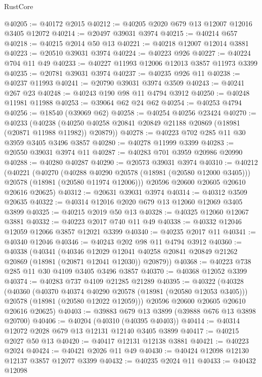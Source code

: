 \begin{lexlean}{RustCore}
\begin{coremodule}
@40205 := @40172 @2015
@40212 := @40205 @2020 @679 @13 @12007 @12016 @3405 @12072
@40214 := @20497 @39031 @3974
@40215 := @40214 @657
@40218 := @40215 @2014 @50 @13
@40221 := @40218 @12007 @12014 @3881
@40223 := @20510 @39031 @3974
@40224 := @40223 @926
@40227 := @40224 @704 @11 @49
@40233 := @40227 @11993 @12006 @12013 @3857 @11973 @3399
@40235 := @20781 @39031 @3974
@40237 := @40235 @926 @11
@40238 := @40237 @11993
@40241 := @20790 @39031 @3974 @3509
@40243 := @40241 @267 @23
@40248 := @40243 @190 @98 @11 @4794 @3912
@40250 := @40248 @11981 @11988
@40253 := @39064 @62 @24 @62
@40254 := @40253 @4794
@40256 := @18540 (@39069 @62)
@40258 := @40254 @40256 @23424
@40270 := @40233
    (@40238 (@40250 @40258 @20841 @20849 @21188 @20869 (@18981 (@20871 @11988 @11982)) @20879))
@40278 := @40223 @702 @285 @11 @30 @3959 @3405 @3496 @3857
@40280 := @40278 @11999 @3399
@40283 := @20550 @39031 @3974 @11
@40287 := @40283 @701 @3959 @20986 @20990
@40288 := @40280 @40287
@40290 := @20573 @39031 @3974
@40310 := @40212
    (@40221
      (@40270
        (@40288 @40290 @20578 (@18981 (@20580 @12000 @3405)))
        @20578
        (@18981 (@20580 @11974 @12006)))
      @20596
      @20600
      @20605
      @20610
      @20616
      @20625)
@40312 := @20631 @39031 @3974
@40314 := @40312 @3509 @20635
@40322 := @40314 @12016 @2020 @679 @13 @12060 @12069 @3405 @3899
@40325 := @40215 @2019 @50 @13
@40328 := @40325 @12060 @12067 @3881
@40332 := @40223 @2017 @740 @11 @49
@40338 := @40332 @12046 @12059 @12066 @3857 @12021 @3399
@40340 := @40235 @2017 @11
@40341 := @40340 @12046
@40346 := @40243 @202 @98 @11 @4794 @3912
@40360 := @40338
    (@40341
      (@40346
        @12029
        @12041
        @40258
        @20841
        @20849
        @21262
        @20869
        (@18981 (@20871 @12041 @12030))
        @20879))
@40368 := @40223 @738 @285 @11 @30 @4109 @3405 @3496 @3857
@40370 := @40368 @12052 @3399
@40374 := @40283 @737 @4109 @21285 @21289
@40395 := @40322
    (@40328
      (@40360
        (@40370 @40374 @40290 @20578 (@18981 (@20580 @12053 @3405)))
        @20578
        (@18981 (@20580 @12022 @12059)))
      @20596
      @20600
      @20605
      @20610
      @20616
      @20625)
@40403 := @39883 @679 @13 @3899 (@39888 @676 @13 @3898 @20700)
@40406 := @40204 (@40310 (@40395 @40403))
@40414 := @40314 @12072 @2028 @679 @13 @12131 @12140 @3405 @3899
@40417 := @40215 @2027 @50 @13
@40420 := @40417 @12131 @12138 @3881
@40421 := @40223 @2024
@40424 := @40421 @2026 @11 @49
@40430 := @40424 @12098 @12130 @12137 @3857 @12077 @3399
@40432 := @40235 @2024 @11
@40433 := @40432 @12098

\end{coremodule}
\end{lexlean}
